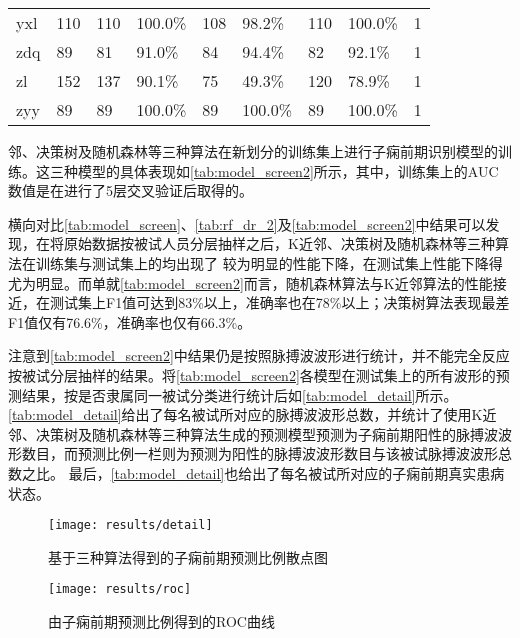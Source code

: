 \begin{landscape}
\begin{longtable}{m{2cm}<{\centering}m{2cm}<{\centering}m{2cm}<{\centering}m{2cm}<{\centering}m{2cm}<{\centering}m{2cm}<{\centering}m{2cm}<{\centering}m{2cm}<{\centering}m{2cm}<{\centering}}
            yxl                   & 110                   & 110        & 100.0\%    & 108        & 98.2\%     & 110        & 100.0\%     & 1                                                                      \\
            zdq                   & 89                    & 81         & 91.0\%     & 84         & 94.4\%     & 82         & 92.1\%      & 1                                                                      \\
            zl                    & 152                   & 137        & 90.1\%     & 75         & 49.3\%     & 120        & 78.9\%      & 1                                                                      \\
            zyy                   & 89                    & 89         & 100.0\%    & 89         & 100.0\%    & 89         & 100.0\%     & 1                                                                       \\    
      \end{longtable}
\end{landscape}

\noindent
邻、决策树及随机森林等三种算法在新划分的训练集上进行子痫前期识别模型的训练。这三种模型的具体表现如\autoref{tab:model_screen2}所示，其中，训练集上的AUC数值是在进行了5层交叉验证后取得的。

横向对比\autoref{tab:model_screen}、\autoref{tab:rf_dr_2}及\autoref{tab:model_screen2}中结果可以发现，在将原始数据按被试人员分层抽样之后，K近邻、决策树及随机森林等三种算法在训练集与测试集上的均出现了
较为明显的性能下降，在测试集上性能下降得尤为明显。而单就\autoref{tab:model_screen2}而言，随机森林算法与K近邻算法的性能接近，在测试集上F1值可达到83\%以上，准确率也在78\%以上；决策树算法表现最差F1值仅有76.6\%，准确率也仅有66.3\%。

注意到\autoref{tab:model_screen2}中结果仍是按照脉搏波波形进行统计，并不能完全反应按被试分层抽样的结果。将\autoref{tab:model_screen2}各模型在测试集上的所有波形的预测结果，按是否隶属同一被试分类进行统计后如\autoref{tab:model_detail}所示。
\autoref{tab:model_detail}给出了每名被试所对应的脉搏波波形总数，并统计了使用K近邻、决策树及随机森林等三种算法生成的预测模型预测为子痫前期阳性的脉搏波波形数目，而预测比例一栏则为预测为阳性的脉搏波波形数目与该被试脉搏波波形总数之比。
最后，\autoref{tab:model_detail}也给出了每名被试所对应的子痫前期真实患病状态。

\begin{figure}[htbp]
      \centering
      \texttt{[image: results/detail]}
      \caption[基于三种算法得到的子痫前期预测比例散点图]{\label{fig:model_detail}基于三种算法得到的子痫前期预测比例散点图}
\end{figure}
\begin{figure}[htbp]
      \centering
      \texttt{[image: results/roc]}
      \caption[由子痫前期预测比例得到的ROC曲线]{\label{fig:model_roc}由子痫前期预测比例得到的ROC曲线}
\end{figure}

